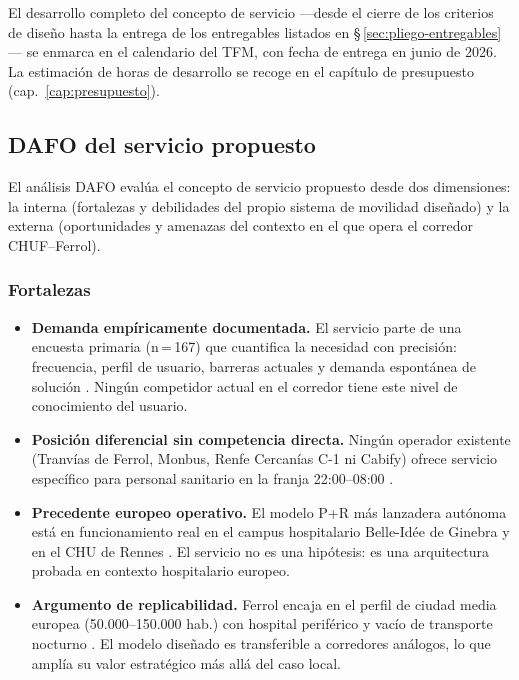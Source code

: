 El desarrollo completo del concepto de servicio —desde el cierre de
los criterios de diseño hasta la entrega de los entregables listados
en §\,\ref{sec:pliego-entregables}— se enmarca en el calendario del
\acs{TFM}, con fecha de entrega en junio de 2026. La estimación de
horas de desarrollo se recoge en el capítulo de presupuesto
(cap.~\ref{cap:presupuesto}).

\subsection{DAFO del servicio propuesto}\label{sec:dafo}

El análisis DAFO evalúa el concepto de servicio propuesto desde
dos dimensiones: la interna (fortalezas y debilidades del propio
sistema de movilidad diseñado) y la externa (oportunidades y
amenazas del contexto en el que opera el corredor CHUF--Ferrol).

\subsubsection{Fortalezas}
\label{sec:dafo-fortalezas}

\begin{itemize}

	\item \textbf{Demanda empíricamente documentada.} El servicio
	parte de una encuesta primaria (n\,=\,167) que cuantifica la
	necesidad con precisión: frecuencia, perfil de usuario, barreras
	actuales y demanda espontánea de solución
	\parencite{LouridoRegueira2026}. Ningún competidor actual en
	el corredor tiene este nivel de conocimiento del usuario.

	\item \textbf{Posición diferencial sin competencia directa.}
	Ningún operador existente (Tranvías de Ferrol, Monbus, Renfe
	Cercanías C-1 ni Cabify) ofrece servicio específico para
	personal sanitario en la franja 22:00--08:00
	\parencite{Alsaferrol2024horarios,RenfeCercaniasFerrol2026}.

	\item \textbf{Precedente europeo operativo.} El modelo P+R
	más lanzadera autónoma está en funcionamiento real en el
	campus hospitalario Belle-Idée de Ginebra y en el CHU de
	Rennes \parencite{AVENUE2023,SHOW2024Legacy}. El servicio no es
	una hipótesis: es una arquitectura probada en contexto
	hospitalario europeo.

	\item \textbf{Argumento de replicabilidad.} Ferrol encaja
	en el perfil de ciudad media europea (50.000--150.000 hab.)
	con hospital periférico y vacío de transporte nocturno
	\parencite{URBACTNight2024}. El modelo diseñado es
	transferible a corredores análogos, lo que amplía su
	valor estratégico más allá del caso local.

\end{itemize}

